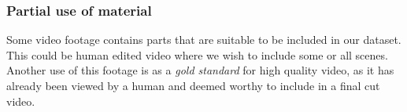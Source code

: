 \subsubsection{Partial use of material}
%
Some video footage contains parts that are suitable to be included in our dataset. This could be human edited video where we wish to include some or all scenes. Another use of this footage is as a \textit{gold standard} for high quality video, as it has already been viewed by a human and deemed worthy to include in a final cut video.
%
